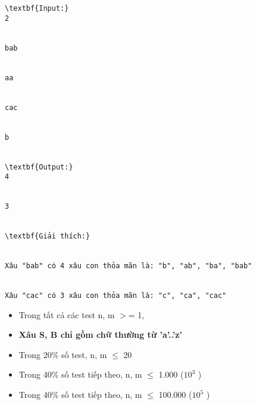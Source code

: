 \begin{verbatim}
\textbf{Input:}
2


bab


aa


cac


b


\textbf{Output:}
4


3


\textbf{Giải thích:}


Xâu "bab" có 4 xâu con thỏa mãn là: "b", "ab", "ba", "bab"


Xâu "cac" có 3 xâu con thỏa mãn là: "c", "ca", "cac" \end{verbatim}
\begin{itemize}
	\item     Trong tất cả các test n, m $>$= 1,   
	\item \textbf{     Xâu S, B chỉ gồm chữ thường từ 'a'..'z'    }
	\item     Trong 20\% số test, n, m  $\le$  20   
	\item     Trong 40\% số test tiếp theo, n, m  $\le$  1.000 ($10^{3}$    )   
	\item     Trong 40\% số test tiếp theo, n, m  $\le$  100.000 ($10^{5}$    )   
\end{itemize}